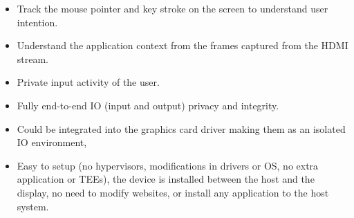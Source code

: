 \begin{itemize}
  \item Track the mouse pointer and key stroke on the screen to understand user intention.
  \item Understand the application context from the frames captured from the HDMI stream.
  \item Private input activity of the user.
  \item Fully end-to-end IO (input and output) privacy and integrity.
  \item Could be integrated into the graphics card driver making them as an isolated IO environment,
  \item Easy to setup (no hypervisors, modifications in drivers or OS, no extra application or TEEs), the device is installed between the host and the display, no need to modify websites, or install any application to the host system.
\end{itemize}